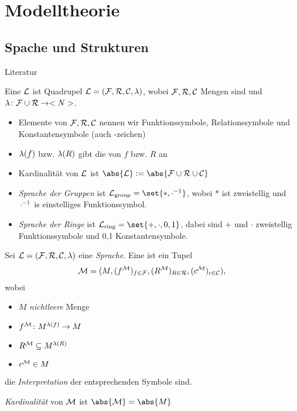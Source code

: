 \section{Modelltheorie}
\subsection{Spache und Strukturen}
Literatur
\begin{definition}[Sprache]
	Eine  $\LL$ ist Quadrupel $\mathcal L = (\mathcal F,\mathcal R, \mathcal C, \lambda)$, wobei $\mathcal F,\mathcal R, \mathcal C$ Mengen sind und $\lambda \colon \mathcal F \cup \mathcal R \to <N>$.
	\begin{itemize}
		\item Elemente von $\mathcal F,\mathcal R,\mathcal C$ nennen wir Funktionssymbole, Relationssymbole und Konstantensymbole (auch -zeichen)
		\item $\lambda(f)$ bzw. $\lambda(R)$ gibt die  von $f$ bzw. $R$ an
		\item Kardinalität  von $\LL$ ist $\abs{\LL} := \abs{\FF \cup \RR \cup \CC}$
	\end{itemize}
\end{definition}
\begin{example}
	\begin{itemize}
		\item \emph{Sprache der Gruppen} ist $\LL_{\group} = \set{\ast, \cdot^{-1}}$, wobei $\ast$ ist zweistellig und $\cdot^{-1}$ is einstelliges Funktionssymbol.
		\item \emph{Sprache der Ringe} ist $\LL_{\ring} = \set{+, \cdot, 0, 1}$, dabei sind $+$ und $\cdot$ zweistellig Funktionssymbole und 0,1 Konstantensymbole.
	\end{itemize}
\end{example}
\begin{definition}[$\LL$-Struktur]
	Sei $\mathcal L = (\mathcal F,\mathcal R, \mathcal C, \lambda)$ eine \emph{Sprache}. Eine  ist ein Tupel
	\begin{align*}
		\mathcal M = (M, (f^{\mathcal M})_{f \in \mathcal F}, (R^{\mathcal M})_{R \in \mathcal R}, (c^{\mathcal M})_{c \in \mathcal C}),
	\end{align*}
	wobei
	\begin{itemize}
		\item $M$ \emph{nichtleere} Menge
		\item $f^{\mathcal M}\colon M^{\lambda(f)} \to M$
		\item $R^{\mathcal M} \subseteq M^{\lambda(R)}$
		\item $c^{\mathcal M} \in M$
	\end{itemize}
	die \emph{Interpretation} der entsprechenden Symbole sind.
	\item \emph{Kardinalität} von $\mathcal M$ ist $\abs{\MM} = \abs{M}$
\end{definition}
